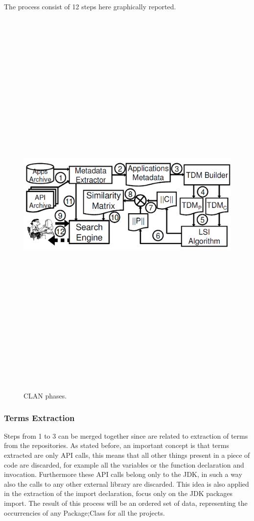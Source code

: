 The process consist of 12 steps here graphically reported.

\begin{figure}[H]
\includegraphics[width=15cm,height=20cm,keepaspectratio]{images/Clan.png}
\centering
\caption{CLAN phases.}
\end{figure}

\subsubsection{Terms Extraction}
Steps from 1 to 3 can be merged together since are related to extraction of terms from the repositories.
As stated before, an important concept is that terms extracted are only API calls, this means that all other things present in a piece of code are discarded, for example all the variables or the function declaration and invocation. Furthermore these API calls belong only to the JDK, in such a way also the calls to any other external library are discarded. This idea is also applied in the extraction of the import declaration, focus only on the JDK packages import.
The result of this process will be an ordered set of data, representing the occurrencies of any Package;Class for all the projects.

